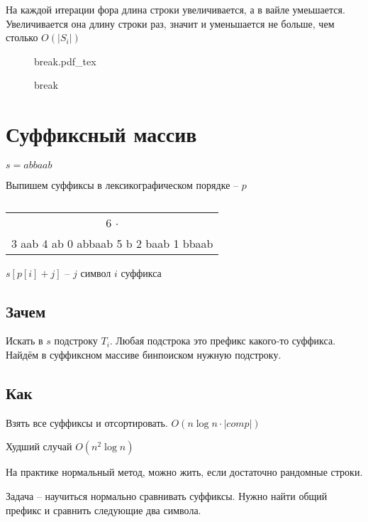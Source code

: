 \documentclass{book}
\theoremstyle{definition}
\newcommand{\incfig}[1]{%
    \def\svgwidth{\columnwidth}
    {#1.pdf_tex}
}
\begin{document}
На каждой итерации фора длина строки увеличивается, а в вайле умеьшается. Увеличивается она длину строки раз, значит и уменьшается не больше, чем столько $O\left( |S_i| \right) $

\begin{figure}[!ht]
    \centering
    \incfig{break}
    \caption{break}
    \label{fig:break}
\end{figure}

\section{Суффиксный массив}

$s = abbaab$

Выпишем суффиксы в лексикографическом порядке -- $p$

 \begin{table}[htpb]
    \centering
    \caption{}
    \label{tab:}
    \begin{tabular}{c}
    6 $\cdot$\\
    3 aab
    4 ab
    0 abbaab
    5 b
    2 baab
    1 bbaab
    \end{tabular}
\end{table}

$s[p[i]+j]$ --  $j$ символ  $i$ суффикса

\subsection{Зачем}

Искать в  $s$ подстроку  $T_i$. Любая подстрока это префикс какого-то суффикса. Найдём в суффиксном массиве бинпоиском нужную подстроку. 

\subsection{Как}

 \begin{statement}

     Взять все суффиксы и отсортировать. $O\left( n\log n \cdot \left| comp \right|  \right) $ 

     Худший случай $O\left( n^2\log n \right) $ 

     На практике нормальный метод, можно жить, если достаточно рандомные  строки.
\end{statement}

Задача -- научиться нормально сравнивать суффиксы. Нужно найти общий префикс и сравнить следующие два символа. 
\end{document}

